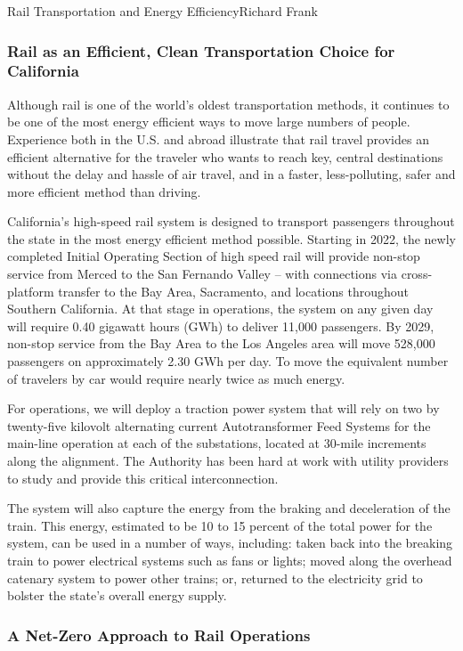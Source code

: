 \documentclass{papertex}
\begin{document}
\begin{news}{2}{Rail Transportation and Energy Efficiency}{Richard Frank}{}{}
\subsubsection*{Rail as an Efficient, Clean Transportation Choice for
    California}

Although rail is one of the world’s oldest transportation methods, it continues 
to be one of the most energy efficient ways to move large numbers of people. 
Experience both in the U.S. and abroad illustrate that rail travel provides an 
efficient alternative for the traveler who wants to reach key, central 
destinations without the delay and hassle of air travel, and in a faster, 
less-polluting, safer and more efficient method than driving.

California’s high-speed rail system is designed to transport passengers 
throughout the state in the most energy efficient method possible. Starting in 
2022, the newly completed Initial Operating Section of high speed rail will 
provide non-stop service from Merced to the San Fernando Valley – with 
connections via cross-platform transfer to the Bay Area, Sacramento, and 
locations throughout Southern California. At that stage in operations, the 
system on any given day will require 0.40 gigawatt hours (GWh) to deliver 
11,000 passengers.  By 2029, non-stop service from the Bay Area to the Los 
Angeles area will move 528,000 passengers on approximately 2.30 GWh per day. 
To move the equivalent number of travelers by car would require nearly twice 
as much energy.

For operations, we will deploy a traction power system that will rely on two 
by twenty-five kilovolt alternating current Autotransformer Feed Systems for 
the main-line operation at each of the substations, located at 30-mile 
increments along the alignment.  The Authority has been hard at work with 
utility providers to study and provide this critical interconnection.

The system will also capture the energy from the braking and deceleration of 
the train. This energy, estimated to be 10 to 15 percent of the total power 
for the system, can be used in a number of ways, including: taken back into 
the breaking train to power electrical systems such as fans or lights; moved 
along the overhead catenary system to power other trains; or, returned to the 
electricity grid to bolster the state’s overall energy supply.

\subsubsection*{A Net-Zero Approach to Rail Operations}


\end{news}
\end{document}
